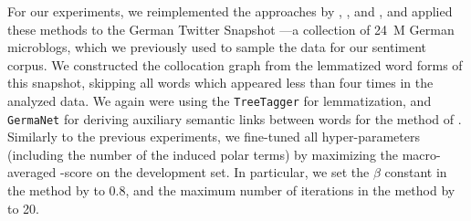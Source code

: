 For our experiments, we reimplemented the approaches by
\citet{Takamura:05}, \citet{Velikovich:10}, \citet{Kiritchenko:14} and
\citet{Severyn:15}, and applied these methods to the German Twitter
Snapshot \cite{Scheffler:14}---a collection of 24~M German microblogs,
which we previously used to sample the data for our sentiment corpus.
We constructed the collocation graph from the lemmatized word forms of
this snapshot, skipping all words which appeared less than four times
in the analyzed data.  We again were using the \texttt{TreeTagger}
\cite{Schmid:95} for lemmatization, and \texttt{GermaNet} for deriving
auxiliary semantic links between words for the method of
\citet{Takamura:05}.  Similarly to the previous experiments, we
fine-tuned all hyper-parameters (including the number of the induced
polar terms) by maximizing the macro-averaged \F{}-score on the
development set.  In particular, we set the $\beta$ constant in the
method by \citet{Takamura:05} to 0.8, and the maximum number of
iterations in the method by \citet{Velikovich:10} to 20.



